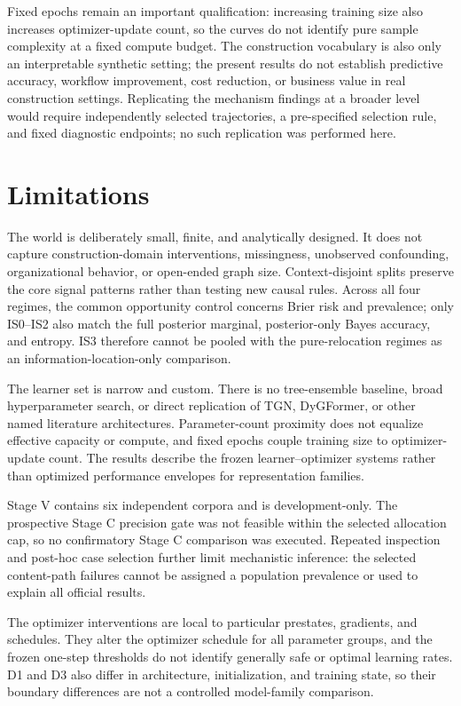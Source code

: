 \documentclass[11pt]{article}
\begin{document}
Fixed epochs remain an important qualification: increasing training size also increases optimizer-update count, so the curves do not identify pure sample complexity at a fixed compute budget. The construction vocabulary is also only an interpretable synthetic setting; the present results do not establish predictive accuracy, workflow improvement, cost reduction, or business value in real construction settings. Replicating the mechanism findings at a broader level would require independently selected trajectories, a pre-specified selection rule, and fixed diagnostic endpoints; no such replication was performed here.

\section{Limitations}

The world is deliberately small, finite, and analytically designed. It does not capture construction-domain interventions, missingness, unobserved confounding, organizational behavior, or open-ended graph size. Context-disjoint splits preserve the core signal patterns rather than testing new causal rules. Across all four regimes, the common opportunity control concerns Brier risk and prevalence; only IS0--IS2 also match the full posterior marginal, posterior-only Bayes accuracy, and entropy. IS3 therefore cannot be pooled with the pure-relocation regimes as an information-location-only comparison.

The learner set is narrow and custom. There is no tree-ensemble baseline, broad hyperparameter search, or direct replication of TGN, DyGFormer, or other named literature architectures. Parameter-count proximity does not equalize effective capacity or compute, and fixed epochs couple training size to optimizer-update count. The results describe the frozen learner--optimizer systems rather than optimized performance envelopes for representation families.

Stage V contains six independent corpora and is development-only. The prospective Stage C precision gate was not feasible within the selected allocation cap, so no confirmatory Stage C comparison was executed. Repeated inspection and post-hoc case selection further limit mechanistic inference: the selected content-path failures cannot be assigned a population prevalence or used to explain all official results.

The optimizer interventions are local to particular prestates, gradients, and schedules. They alter the optimizer schedule for all parameter groups, and the frozen one-step thresholds do not identify generally safe or optimal learning rates. D1 and D3 also differ in architecture, initialization, and training state, so their boundary differences are not a controlled model-family comparison.
\end{document}
